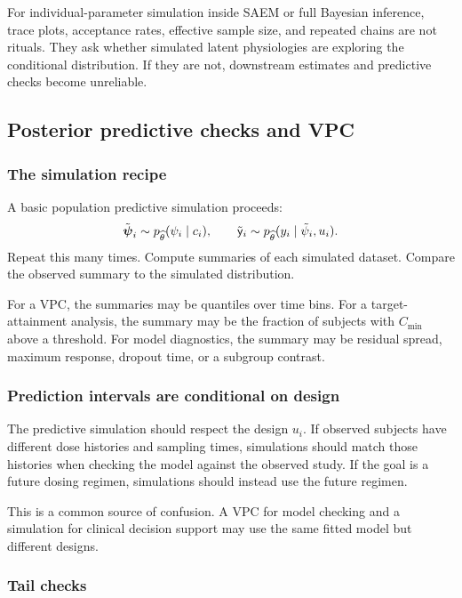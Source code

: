 For individual-parameter simulation inside SAEM or full Bayesian inference, trace plots, acceptance rates, effective sample size, and repeated chains are not rituals.  They ask whether simulated latent physiologies are exploring the conditional distribution.  If they are not, downstream estimates and predictive checks become unreliable.

\subsection{Posterior predictive checks and VPC}

\subsubsection*{The simulation recipe}

A basic population predictive simulation proceeds:
\[
  \tilde{\boldsymbol{\psi}}_i\sim p_{\widehat\theta}(\psi_i\mid c_i),
  \qquad
  \tilde{\mathsf{y}}_i\sim p_{\widehat\theta}(y_i\mid\tilde\psi_i,u_i).
\]
Repeat this many times.  Compute summaries of each simulated dataset.  Compare the observed summary to the simulated distribution.

For a VPC, the summaries may be quantiles over time bins.  For a target-attainment analysis, the summary may be the fraction of subjects with \(C_{\min}\) above a threshold.  For model diagnostics, the summary may be residual spread, maximum response, dropout time, or a subgroup contrast.

\subsubsection*{Prediction intervals are conditional on design}

The predictive simulation should respect the design \(u_i\).  If observed subjects have different dose histories and sampling times, simulations should match those histories when checking the model against the observed study.  If the goal is a future dosing regimen, simulations should instead use the future regimen.

This is a common source of confusion.  A VPC for model checking and a simulation for clinical decision support may use the same fitted model but different designs.

\subsubsection*{Tail checks}

